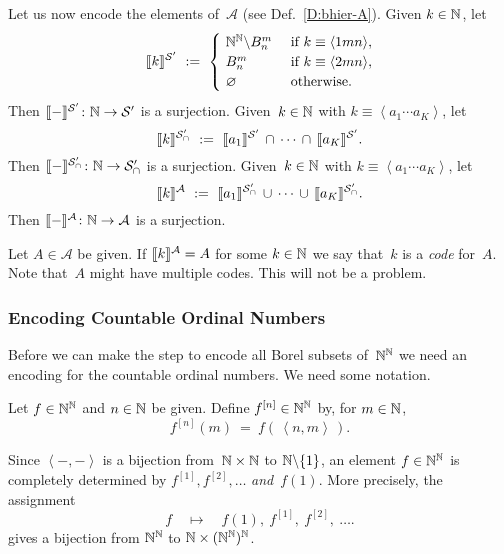 \documentclass[main.tex]{subfiles}
\begin{document}
Let us now encode the elements of~$\mathcal{A}$
 (see Def.~\ref{D:bhier-A}).
Given $k \in \mathbb{N}$, let
\begin{equation*}
 \decode{k}^{\mathcal{S}'}
\ \eqdf \ 
\begin{cases}
\ \N^\N \backslash B^m_n & \text{ if $k\equiv\left<1mn\right>$}, \\
\ B^m_n & \text{ if $k\equiv\left<2mn\right>$}, \\
\ \varnothing &\text{ otherwise.}
\end{cases}
\end{equation*}
Then $\decode-^{\mathcal{S}'}\colon\N\ra \mathcal{S}'$
is a surjection.
Given~$k\in \mathbb{N}$ with $k\equiv \left<a_1\dotsb a_K\right>$, let
\begin{equation*}
 \decode{k}^{\mathcal{S}_\cap'}
\ \eqdf\ 
\decode{a_1}^{\mathcal{S}'} \,\cap\,\dotsb\,\cap\,\decode{a_K}^{\mathcal{S}'}.
\end{equation*}
Then $\decode-^{\mathcal{S}_\cap'}\colon \N\ra {\mathcal{S}_\cap'}$
is a surjection.
Given~$k\in \mathbb{N}$ with $k\equiv \left<a_1\dotsb a_K\right>$, let
\begin{equation*}
 \decode{k}^{\mathcal{A}}
\ \eqdf\ 
\decode{a_1}^{\mathcal{S}_\cap'} \,\cup\,
   \dotsb\,\cup\,\decode{a_K}^{\mathcal{S}_\cap'}.
\end{equation*}
Then $\decode-^{\mathcal{A}}\colon \N\ra {\mathcal{A}}$
is a surjection.

Let $A\in \mathcal{A}$ be given.
If
$\decode{k}^\mathcal{A}=A$
for some 
 $k\in \mathbb{N}$ 
we say
that~$k$ is a \emph{code} for~$A$.
Note that~$A$ might have multiple codes.
This will not be a problem.

\subsubsection{Encoding Countable Ordinal Numbers}$\,$\\
Before we can make the step
to encode all Borel subsets of~$\mathbb{N}^{\mathbb{N}}$
we need an encoding for
the countable ordinal numbers.
We need some notation.
\begin{nt}
Let $f\in\mathbb{N}^{\mathbb{N}}$
and $n\in \mathbb{N}$ be given.
Define $f^{[n]}\in \mathbb{N}^{\mathbb{N}}$ by, for $m\in\mathbb{N}$,
\begin{equation*}
f^{[n]} (m) \ =\ f(\,\left<n,m\right>\,).
\end{equation*}
\end{nt}
Since $\left< -,-\right>$
is a bijection from~$\mathbb{N}\times\mathbb{N}$
to $\mathbb{N}\backslash\{1\}$,
an element $f\in\mathbb{N}^{\mathbb{N}}$
is completely determined
by $f^{[1]},f^{[2]},\dotsc$
\emph{and}~$f(1)$.
More precisely,
the assignment
\begin{equation*}
f\quad\mapsto\quad
 f(1),\ f^{[1]},\  f^{[2]},\ \dotsc.
\end{equation*}
gives a bijection from
$\mathbb{N}^{\mathbb{N}}$ to $\mathbb{N} \times (\mathbb{N}^{\mathbb{N}})^{\mathbb{N}}$.
\end{document}
